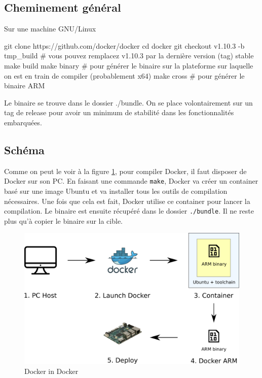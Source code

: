 \documentclass[11pt,a4paper,oneside]{report}
\newcommand{\code}[1]{\texttt{#1}} %
\begin{document}
\subsection{Cheminement général}

Sur une machine GNU/Linux

\begin{bashcode}
git clone https://github.com/docker/docker
cd docker
git checkout v1.10.3 -b tmp_build # vous pouvez remplacez v1.10.3 par la dernière version (tag) stable
make build
make binary # pour générer le binaire sur la plateforme sur laquelle on est en train de compiler (probablement x64)
make cross # pour générer le binaire ARM
\end{bashcode}

Le binaire se trouve dans le dossier ./bundle. On se place volontairement sur un tag de release pour avoir un minimum de stabilité dans les fonctionnalités embarquées.

\subsection{Schéma}

Comme on peut le voir à la figure \ref{fig_docker_in_docker}, pour compiler Docker, il faut disposer de Docker sur son PC. En faisant une commande \code{make}, Docker va créer un container basé sur une image Ubuntu et va installer tous les outils de compilation nécessaires. Une fois que cela est fait, Docker utilise ce container pour lancer la compilation. Le binaire est ensuite récupéré dans le dossier \code{./bundle}. Il ne reste plus qu'à copier le binaire sur la cible.

\begin{figure}[H]
    \begin{center}
        \includegraphics[scale=0.5]{img/docker_in_docker}
    \end{center}
    \caption{Docker in Docker}
    \label{fig_docker_in_docker}
\end{figure}
\end{document}
